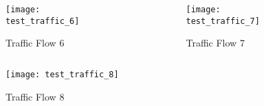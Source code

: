 \documentclass{beamer}
\begin{document}
\begin{frame}
\begin{overprint}
		\begin{columns}
		\begin{column}{.5\textwidth}
			\begin{figure}
			\caption{Traffic Flow 6}
			\texttt{[image: test\_traffic\_6]}
			\end{figure}
		\end{column}
		\begin{column}{.5\textwidth}
			\begin{figure}
			\caption{Traffic Flow 7}
			\texttt{[image: test\_traffic\_7]}
			\end{figure}
		\end{column}
		\end{columns}

		\vspace{15pt}
		\begin{figure}
		\caption{Traffic Flow 8}
		\texttt{[image: test\_traffic\_8]}
		\end{figure}
	\end{overprint}
\end{frame}
\end{document}
